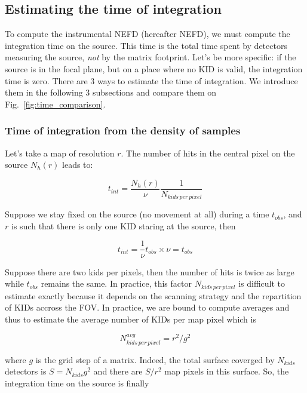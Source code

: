 \subsection{Estimating the time of integration}

To compute the instrumental NEFD (hereafter NEFD), we must compute the
integration time on the source. This time is the total time spent by detectors
measuring the source, \emph{not} by the matrix footprint. Let's be more
specific: if the source is in the focal plane, but on a place where no KID is
valid, the integration time is zero. There are 3 ways to estimate the time of
integration. We introduce them in the following 3 subsections and compare them
on Fig.~\ref{fig:time_comparison}.

\subsubsection{Time of integration from the density of samples}

Let's take a map of resolution $r$. The number of hits in the central pixel on
the source $N_h(r)$ leads to:

\begin{equation}
t_{int} = \frac{N_h(r)}{\nu}\frac{1}{N_{kids\,per\,pixel}}
\end{equation}

Suppose we stay fixed on the source (no movement at all) during a time $t_{obs}$, and $r$ is such that
there is only one KID staring at the source, then

\begin{equation}
t_{int} = \frac{1}{\nu}t_{obs}\times\nu = t_{obs}
\end{equation}

Suppose there are two kids per pixels, then the number of hits is twice as large
while $t_{obs}$ remains the same. In practice, this factor
$N_{kids\,per\,pixel}$ is difficult to estimate exactly because it depends on the
scanning strategy and the repartition of KIDs accross the FOV. In practice, we
are bound to compute averages and thus to estimate the average number of KIDs
per map pixel which is 

\begin{equation}
N^{avg}_{kids\,per\,pixel} = r^2/g^2
\end{equation}

where $g$ is the grid step of a matrix. Indeed, the total surface coverged by
$N_{kids}$ detectors is $S = N_{kids}g^2$ and there are $S/r^2$ map pixels in
this surface. So, the integration time on the source is finally

